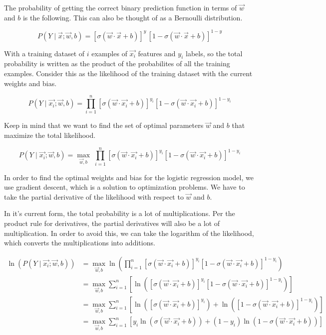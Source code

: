\documentclass[openany]{book}
\begin{document}
The probability of getting the correct binary prediction function in
terms of \(\vec{w}\) and \(b\) is the following. This can also be
thought of as a Bernoulli distribution.

\[
P(Y \mid \vec{x}; \vec{w}, b) =
\left[ \sigma(\vec{w} \cdot \vec{x} + b) \right]^{y} \,
\left[ 1 - \sigma(\vec{w} \cdot \vec{x} + b) \right]^{1 - y}
\]

With a training dataset of \(i\) examples of \(\vec{x_i}\) features and
\(y_i\) labels, so the total probability is written as the product of
the probabilites of all the training examples. Consider this as the
likelihood of the training dataset with the current weights and bias.

\[
P(Y \mid \vec{x_i}; \vec{w}, b) 
= \prod_{i=1}^{n}
\left[ \sigma(\vec{w} \cdot \vec{x_i} + b) \right]^{y_i}
\left[ 1 - \sigma(\vec{w} \cdot \vec{x_i} + b) \right]^{1 - y_i}
\]

Keep in mind that we want to find the set of optimal parameters
\(\vec{w}\) and \(b\) that maximize the total likelihood.

\[
P(Y \mid \vec{x_i}; \vec{w}, b) 
= \max_{\vec{w}, b} \;
\prod_{i=1}^{n}
\left[ \sigma(\vec{w} \cdot \vec{x_i} + b) \right]^{y_i}
\left[ 1 - \sigma(\vec{w} \cdot \vec{x_i} + b) \right]^{1 - y_i}
\]

    In order to find the optimal weights and bias for the logistic
regression model, we use gradient descent, which is a solution to
optimization problems. We have to take the partial derivative of the
likelihood with respect to \(\vec{w}\) and \(b\).

In it's current form, the total probability is a lot of multiplications.
Per the product rule for derivatives, the partial derivatives will also
be a lot of multiplication. In order to avoid this, we can take the
logarithm of the likelihood, which converts the multiplications into
additions.

\begin{align*}
\ln(P(Y \mid \vec{x_i}; \vec{w}, b)) &= \max_{\vec{w}, b} \ln(\prod_{i=1}^{n} [\sigma{(\vec{w} \cdot \vec{x_i} + b)}]^{y_i} [1 - \sigma{(\vec{w} \cdot \vec{x_i} + b)}]^{1-y_i}) \\
&= \max_{\vec{w}, b} \sum_{i=1}^{n}[ \ln([\sigma{(\vec{w} \cdot \vec{x_i} + b)}]^{y_i} [1 - \sigma{(\vec{w} \cdot \vec{x_i} + b)}]^{1-y_i})] \\
&= \max_{\vec{w}, b} \sum_{i=1}^{n}[ \ln([\sigma{(\vec{w} \cdot \vec{x_i} + b)}]^{y_i}) + \ln([1 - \sigma{(\vec{w} \cdot \vec{x_i} + b)}]^{1-y_i})] \\
&= \max_{\vec{w}, b} \sum_{i=1}^{n}[ y_i \ln(\sigma{(\vec{w} \cdot \vec{x_i} + b)}) + (1-y_i) \ln(1 - \sigma{(\vec{w} \cdot \vec{x_i} + b)})] \\
\end{align*}
\end{document}
